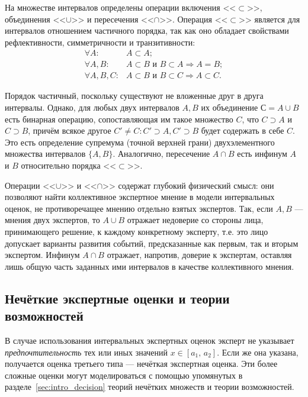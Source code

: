 На множестве интервалов определены операции включения <<$\subset$>>, объединения <<$\cup$>> и пересечения <<$\cap$>>. Операция 
<<$\subset$>> является для интервалов отношением частичного порядка, так как оно обладает свойствами рефлективности, симметричности и транзитивности:
\begin{equation}
\label{interv_order}
\begin{split}
\forall A: & A \subset A; \\
\forall A, B: & A \subset B \text{ и } B \subset A \Rightarrow A = B; \\
\forall A, B, C: & A \subset B \text{ и } B \subset C \Rightarrow A \subset C.
\end{split}
\end{equation}

Порядок частичный, поскольку существуют не вложенные друг в друга интервалы. Однако, для любых двух интервалов $A, B$ их объединение $С = A \cup B$ есть бинарная операцию, сопоставляющая им такое множество $C$, что $C \supset A$ и $C \supset B$, причём всякое другое $C' \neq C: C' \supset A, C' \supset B$ будет содержать в себе $C$. Это есть определение супремума (точной верхней грани) двухэлементного множества интервалов $\{A, B\}$. %
Аналогично, пересечение $A \cap B$ есть инфинум $A$ и $B$ относительно порядка <<$\subset$>>.

Операции <<$\cup$>> и <<$\cap$>> содержат глубокий физический смысл: они позволяют найти коллективное экспертное мнение в модели интервальных оценок, не противоречащее мнению отдельно взятых экспертов. Так, если $A, B$ --- мнения двух экспертов, то $A \cup B$ отражает недоверие со стороны лица, принимающего решение, к каждому конкретному эксперту, т.е. это лицо допускает варианты развития событий, предсказанные как первым, так и вторым экспертом. Инфинум  $A \cap B$ отражает, напротив, доверие к экспертам, оставляя лишь общую часть заданных ими интервалов в качестве коллективного мнения.

\subsection{Нечёткие экспертные оценки и теории возможностей}

В случае использования интервальных экспертных оценок эксперт не указывает {\sl предпочтительность} тех или иных значений $x \in [a_1,\, a_2]$. Если же она указана, получается оценка третьего типа --- нечёткая экспертная оценка. Эти более сложные оценки могут моделироваться с помощью упомянутых в разделе~\ref{sec:intro_decision} теорий нечётких множеств и теории возможностей.

